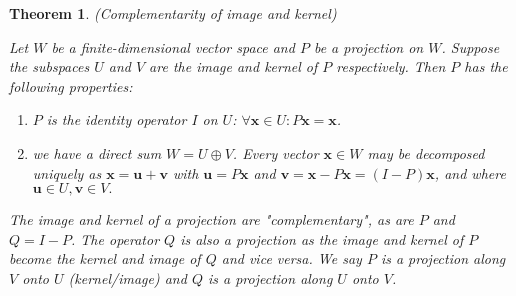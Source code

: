 \documentclass[12pt]{article}
\newtheorem{theorem}{Theorem}[section]
\theoremstyle{definition}
\theoremstyle{remark}
\begin{document}
        \begin{theorem}(Complementarity of image and kernel)
            
        Let $W$ be a finite-dimensional vector space and $P$ be a projection on $W$. Suppose the subspaces $U$ and $V$ are the image and kernel of $P$ respectively. Then $P$ has the following properties:

        \begin{enumerate}
            \item $P$ is the identity operator $I$ on $U$: $\forall \mathbf x \in U: P \mathbf x = \mathbf x$.
            
            \item we have a direct sum $W = U \oplus V$. Every vector $\mathbf x \in W$ may be decomposed uniquely as $\mathbf x = \mathbf u + \mathbf v$ with $\mathbf u = P \mathbf x$ and $\mathbf v = \mathbf x - P \mathbf x = \left(I-P\right) \mathbf x$, and where $\mathbf u \in U, \mathbf v \in V.$
            
        \end{enumerate}
        The image and kernel of a projection are "complementary", as are $P$ and $Q = I - P$. The operator $Q$ is also a projection as the image and kernel of $P$ become the kernel and image of $Q$ and vice versa. We say $P$ is a projection along $V$ onto $U$ (kernel/image) and $Q$ is a projection along $U$ onto $V$.
        \end{theorem}
\end{document}
